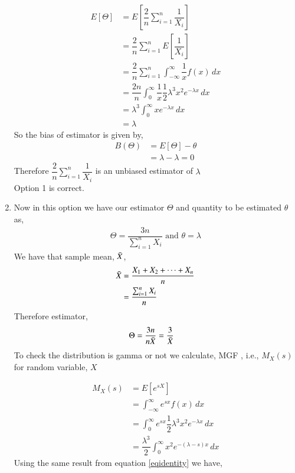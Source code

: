 \documentclass[journal,12pt,twocolumn]{IEEEtran}
\theoremstyle{definition}
\begin{document}
\begin{enumerate}
\begin{align}
    E[\Theta ] &= E  \left[   \dfrac{2}{n} \sum_{i=1}^{n} \dfrac{1}{X_i}  \right] \\
    & = \dfrac{2}{n} \sum_{i=1}^{n} E  \left[ \dfrac{1}{X_i}  \right] \\
 & =  \dfrac{2}{n} \sum_{i=1}^{n} \int_{-\infty}^{\infty} \dfrac{1}{x} f(x)\,dx \\
    \label{eq1}
   & = \dfrac{2n}{n} \int_{0}^{\infty} \dfrac{1}{x} \dfrac{1}{2} \lambda^3x^2e^{-\lambda x}\,dx \\
    & = \lambda^3  \int_{0}^{\infty}  x e^{-\lambda x}\,dx \\
    &= \lambda
\end{align}
So the bias of estimator is given by,
\begin{align}
    B(\Theta) &= E[\Theta] - \theta  \\
    &= \lambda - \lambda = 0
\end{align}
Therefore $\dfrac{2}{n} \sum_{i=1}^{n} \dfrac{1}{X_i} $ is an unbiased estimator of $ \lambda$ \\
Option 1 is correct. \\
\item
 Now in this option we have our estimator $ \Theta$ and quantity to be estimated $ \theta $ as,
 \begin{align}
     \Theta = \dfrac{3n}{\sum_{i=1}^{n} X_i } \text{  and  }
     \theta = \lambda
 \end{align}
We have that sample mean, $ \Bar{X}$,
\begin{align}
    \Bar{X} &= \dfrac{X_1+X_2+ \cdots +X_n}{n} \\
    & = \dfrac{\sum_{i=1}^{n} X_i}{n}
\end{align}
Therefore estimator,
\begin{align}
    \Theta &= \dfrac{3n}{n \Bar{X}} 
    = \dfrac{3}{ \Bar{X}} 
    \label{xbar}
\end{align}
To check the distribution is gamma or not we calculate, MGF , i.e., $ M_X(s) $ for random variable, $ X $

\begin{align}
    M_X(s) &= E[e^{sX}] \\
    &=  \int_{-\infty}^{\infty} e^{sx} f(x)\,dx \\
    &=    \int_{0}^{\infty} e^{sx} \dfrac{1}{2} \lambda^3x^2e^{-\lambda x}\,dx \\
    &= \dfrac{\lambda^3}{2} \int_{0}^{\infty} x^2 e^{-(\lambda - s) x}\,dx 
\end{align}
Using the same result from equation \eqref{eqidentity} we have,


\end{enumerate}
\end{document}
